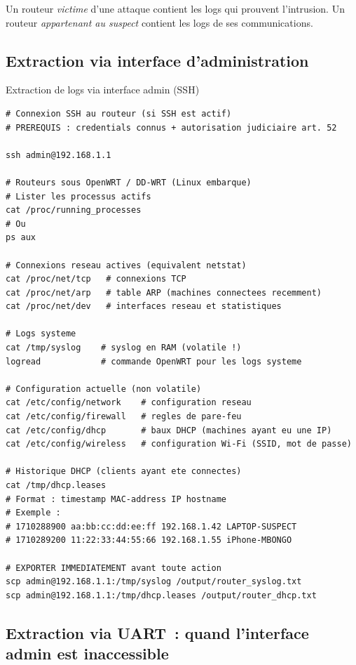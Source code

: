 Un routeur \emph{victime} d'une attaque contient les logs qui prouvent
l'intrusion. Un routeur \emph{appartenant au suspect} contient les
logs de ses communications.

\subsection{Extraction via interface d'administration}

\begin{boxoutils}{Extraction de logs via interface admin (SSH)}
\begin{lstlisting}[language=bash_forensique]
# Connexion SSH au routeur (si SSH est actif)
# PREREQUIS : credentials connus + autorisation judiciaire art. 52

ssh admin@192.168.1.1

# Routeurs sous OpenWRT / DD-WRT (Linux embarque)
# Lister les processus actifs
cat /proc/running_processes
# Ou
ps aux

# Connexions reseau actives (equivalent netstat)
cat /proc/net/tcp   # connexions TCP
cat /proc/net/arp   # table ARP (machines connectees recemment)
cat /proc/net/dev   # interfaces reseau et statistiques

# Logs systeme
cat /tmp/syslog    # syslog en RAM (volatile !)
logread            # commande OpenWRT pour les logs systeme

# Configuration actuelle (non volatile)
cat /etc/config/network    # configuration reseau
cat /etc/config/firewall   # regles de pare-feu
cat /etc/config/dhcp       # baux DHCP (machines ayant eu une IP)
cat /etc/config/wireless   # configuration Wi-Fi (SSID, mot de passe)

# Historique DHCP (clients ayant ete connectes)
cat /tmp/dhcp.leases
# Format : timestamp MAC-address IP hostname
# Exemple :
# 1710288900 aa:bb:cc:dd:ee:ff 192.168.1.42 LAPTOP-SUSPECT
# 1710289200 11:22:33:44:55:66 192.168.1.55 iPhone-MBONGO

# EXPORTER IMMEDIATEMENT avant toute action
scp admin@192.168.1.1:/tmp/syslog /output/router_syslog.txt
scp admin@192.168.1.1:/tmp/dhcp.leases /output/router_dhcp.txt
\end{lstlisting}
\end{boxoutils}

\subsection{Extraction via UART~: quand l'interface admin est inaccessible}


